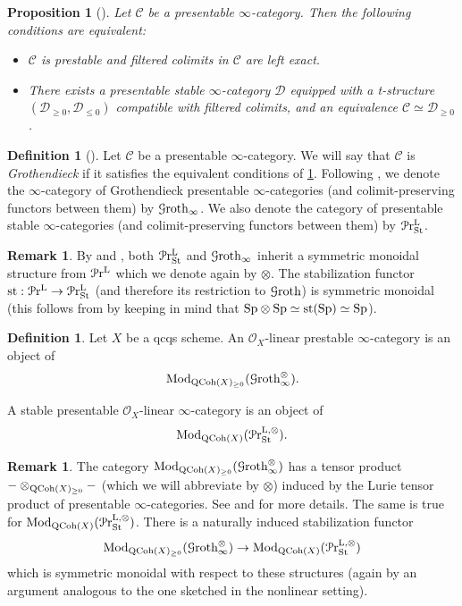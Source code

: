 \documentclass[11pt, twoside]{article} %
\numberwithin{equation}{section}
\theoremstyle{plain}
\newtheorem{prop}[thm]{Proposition}
\theoremstyle{definition}
\newtheorem{defin}[thm]{Definition}
\newtheorem{rem}[thm]{Remark}
\newcommand{\Sp}{\mathrm{Sp}}
\newcommand{\cc}{\mathcal C}
\newcommand{\cD}{\mathcal D}
\newcommand{\QCoh}{\textup{QCoh}}
\renewcommand{\Pr}{\mathcal P\textup{r}}
\newcommand{\cG}{\mathcal G}
\newcommand{\cO}{{\mathcal O}}
\newcommand{\Mod}{\textup{Mod}}
\newcommand{\Groth}{\cG\textup{roth}}
\begin{document}
	\begin{prop}[{\cite[Proposition C.1.4.1]{SAG}}]\label{proposition-Grothendieck-cats}
		Let $\cc$ be a presentable $\infty$-category. Then the following conditions are equivalent:
		\begin{itemize}\item $\cc$ is prestable and filtered colimits in $\cc$ are left exact.
			\item There exists a presentable stable $\infty$-category $\cD$ equipped with a t-structure $(\cD_{\geq 0}, \cD_{\leq 0})$ compatible with filtered colimits, and an equivalence $\cc\simeq \cD_{\geq 0}$.
		\end{itemize}
	\end{prop}
	\begin{defin}[{\cite[Definition C.1.4.2]{SAG}}]\label{defin-Grothendieck-cats}Let $\cc$ be a presentable $\infty$-category. We will say that $\cc$ is \textit{Grothendieck}
		if it satisfies the equivalent conditions of \cref{proposition-Grothendieck-cats}. Following \cite[Definition C.3.0.5]{SAG}, we denote the $\infty$-category of Grothendieck presentable $\infty$-categories (and colimit-preserving functors between them) by $\Groth_\infty$. We also denote the category of presentable stable $\infty$-categories (and colimit-preserving functors between them) by $\Pr^{\textup{L}}_{\textup{St}}$.
	\end{defin}
	\begin{rem}
	By \cite{HA} and \cite[Theorem C.4.2.1]{SAG}, both $\Pr^\textup{L}_\textup{St}$ and $\Groth_\infty$ inherit a symmetric monoidal structure from $\Pr^\textup{L}$ which we denote again by $\otimes$. The stabilization functor $\textup{st}:\Pr^\textup{L}\to \Pr^\textup{L}_{\textup{St}}$ (and therefore its restriction to $\Groth$) is symmetric monoidal (this follows from \cite[Example 4.8.1.23]{HA} by keeping in mind that $\Sp\otimes \Sp\simeq \textup{st}(\Sp)\simeq \Sp$).
\end{rem}
	\begin{defin}Let $X$ be a qcqs scheme. An $\cO_X$-linear prestable $\infty$-category is an object of $$\Mod_{\QCoh(X)_{\geq 0}}(\Groth_\infty^\otimes).$$
	
	A stable presentable $\cO_X$-linear $\infty$-category is an object of $$\Mod_{\QCoh(X)}(\Pr^{\textup L, \otimes}_{\textup{St}}).$$
		\end{defin}
	
		
	
	
		\begin{rem}\label{rem-product}The category $\Mod_{\QCoh(X)_{\geq 0}}(\Groth_\infty^\otimes)$ has a tensor product $-\otimes_{\QCoh(X)_{\geq 0}}-$ (which we will abbreviate by $\otimes$) induced by the Lurie tensor product of presentable $\infty$-categories. See \cite[Theorem C.4.2.1]{SAG} and \cite[Section 10.1.6]{SAG} for more details. The same is true for $\Mod_{\QCoh(X)}(\Pr^{\textup L, \otimes}_{\textup{St}})$. There is a naturally induced stabilization functor $$\Mod_{\QCoh(X)_{\geq 0}}(\Groth_\infty^\otimes)\to \Mod_{\QCoh(X)}(\Pr^{\textup L, \otimes}_{\textup{St}})$$ which is symmetric monoidal with respect to these structures (again by an argument analogous to the one sketched in the nonlinear setting). \end{rem}
		
\end{document}

